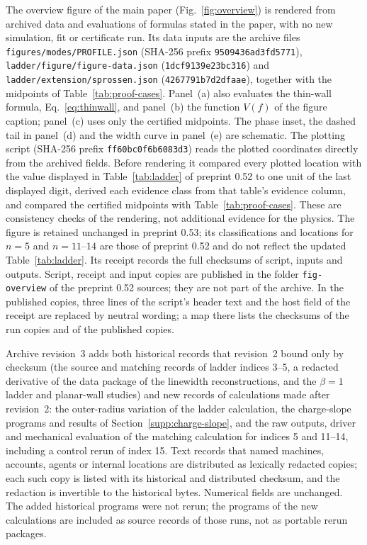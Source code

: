 \documentclass[a4paper,11pt]{article}
\begin{document}
{\sloppy
The overview figure of the main paper (Fig.~\ref{fig:overview}) is
rendered from archived data and evaluations of formulas stated in the
paper, with no new simulation, fit or certificate run. Its data inputs
are the archive files \texttt{figures/modes/PROFILE.json} (SHA-256
prefix \texttt{9509436ad3fd5771}), \texttt{ladder/figure/figure-data.json}
(\texttt{1dcf9139e23bc316}) and \texttt{ladder/extension/sprossen.json}
(\texttt{4267791b7d2dfaae}), together with the midpoints of
Table~\ref{tab:proof-cases}. Panel~(a) also evaluates the thin-wall
formula, Eq.~\eqref{eq:thinwall}, and panel~(b) the function $V(f)$
of the figure caption; panel~(c) uses only the certified midpoints.
The phase inset, the dashed tail in panel~(d) and the width curve in
panel~(e) are schematic. The plotting script (SHA-256 prefix
\texttt{ff60bc0f6b6083d3}) reads the plotted coordinates directly from
the archived fields. Before rendering it compared every plotted location
with the value displayed in Table~\ref{tab:ladder} of preprint 0.52 to one
unit of the last displayed digit, derived each evidence class from that
table's evidence column, and compared the certified midpoints with
Table~\ref{tab:proof-cases}. These are consistency checks of the
rendering, not additional evidence for the physics. The figure is
retained unchanged in preprint 0.53; its classifications and locations for
$n=5$ and $n=11$--$14$ are those of preprint 0.52 and do not reflect the
updated Table~\ref{tab:ladder}. Its receipt records
the full checksums of script, inputs and outputs. Script, receipt and
input copies are published in the folder \texttt{fig-overview} of the
preprint 0.52 sources; they are not part of the archive. In the
published copies, three lines of the script's header text and the host field
of the receipt are replaced by neutral wording; a map there lists the
checksums of the run copies and of the published copies.\par}

Archive revision~3 adds both historical records that revision~2 bound
only by checksum (the source and matching records of ladder indices
3--5, a redacted derivative of the data package of the linewidth
reconstructions, and the $\beta=1$ ladder and planar-wall studies) and
new records of calculations made after revision~2: the outer-radius
variation of the ladder calculation, the charge-slope programs and
results of Section~\ref{supp:charge-slope}, and the raw outputs, driver
and mechanical evaluation of the matching calculation for indices 5 and
11--14, including a control rerun of index 15. Text records that named machines, accounts, agents or internal
locations are distributed as lexically redacted copies; each such copy
is listed with its historical and distributed checksum, and the
redaction is invertible to the historical bytes. Numerical fields are
unchanged. The added historical programs were not rerun; the programs of
the new calculations are included as source records of those runs, not
as portable rerun packages.

\end{document}
